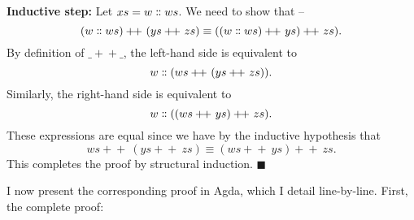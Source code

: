\documentclass[12pt,a4paper,twoside,openright]{report}
\begin{document}
{\bf Inductive step:} Let $xs = w \dblcolon ws$. We need to show that --
$$(w \dblcolon ws) +\!\!+\ (ys +\!\!+\ zs) \equiv ((w \dblcolon ws) +\!\!+\ ys) +\!\!+\ zs).$$
By definition of $\_\!\!+\!\!+\_$, the left-hand side is equivalent to
$$w \dblcolon (ws +\!\!+\ (ys +\!\!+\ zs)).$$
Similarly, the right-hand side is equivalent to
$$w \dblcolon ((ws +\!\!+\ ys) +\!\!+\ zs).$$
These expressions are equal since we have by the inductive hypothesis that $$ws +\!\!+\ (ys +\!\!+\ zs) \equiv (ws +\!\!+\ ys) +\!\!+\ zs.$$
This completes the proof by structural induction.
\hfill{$\blacksquare$}

I now present the corresponding proof in Agda, which I detail line-by-line. First, the complete proof:

\begin{code}
\> \AgdaSymbol{:} \AgdaSymbol{\{} \AgdaSymbol{:} \AgdaSymbol{\}}  \AgdaSymbol{(}   \AgdaSymbol{:}  \AgdaSymbol{)}   \AgdaFunction{++} \AgdaSymbol{(} \AgdaFunction{++} \AgdaSymbol{)}  \AgdaSymbol{(} \AgdaFunction{++} \AgdaSymbol{)} \AgdaFunction{++} \<%
\\
\> \AgdaInductiveConstructor{[]}   \AgdaSymbol{=} \<%
\\
\> \AgdaSymbol{(}  \AgdaSymbol{)}   \AgdaSymbol{=}  \AgdaSymbol{(} \AgdaSymbol{)} \AgdaSymbol{(}   \AgdaSymbol{)}\<%
\end{code}
\end{document}
